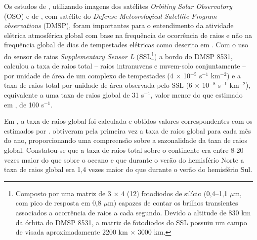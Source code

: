 Os estudos de , utilizando imagens dos satélites \textit{Orbiting Solar Observatory} (OSO) e de  , com satélite do \textit{Defense Meteorological Satellite Program observations} (DMSP), foram importantes para o entendimento da atividade elétrica atmosférica global com base na frequência de ocorrência de raios e não na frequência global de dias de tempestades elétricas como descrito em . Com o uso do sensor de raios \textit{Supplementary Sensor L} (SSL\footnote{Composto por uma matriz de 3 $\times$ 4 (12) fotodiodos de silício (0,4--1,1 $\mu$m, com pico de resposta em 0,8 $\mu$m) capazes de contar os  brilhos transientes  associados a ocorrência de raios a cada segundo. Devido a altitude de 830 km da órbita do DMSP 8531, a matriz de fotodiodos do SSL possuiu um campo de visada aproximadamente 2200 km  $\times$ 3000 km.}) a bordo do DMSP 8531,  calculou a taxa de raios total -- raios intranuvens e nuvem-solo conjuntamente -- por unidade de área de um complexo de tempestades (4 $\times$ 10$^{-5}$ s$^{-1}$ km$^{-2}$) e a taxa de raios total por unidade de área observada pelo SSL (6 $\times$ 10$^{-8}$ s$^{-1}$ km$^{-2}$), equivalente a uma taxa de raios global de 31 s$^{-1}$, valor menor do que estimado em , de 100 s$^{-1}$.

Em , a taxa de raios global foi calculada e obtidos valores correspondentes com os estimados por .   obtiveram pela primeira vez a taxa de raios global para cada mês do ano, proporcionando uma compreensão sobre a sazonalidade da taxa de raios global. Constatou-se que a taxa de raios total sobre o continente era entre 8-20 vezes maior do que sobre o oceano e que durante o verão do hemisfério Norte a taxa de raios global era 1,4 vezes maior do que durante o verão do hemisfério Sul.


